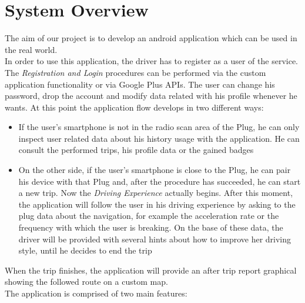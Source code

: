 \chapter{System Overview} \label{chap2}
The aim of our project is to develop an android application which can be used in the real world.\\
In order to use this application, the driver has to register as a user of the service. The \textit{Registration and Login} procedures can be performed via the custom application functionality or via Google Plus APIs.
The user can change his password, drop the account and modify data related with his profile whenever he wants.
At this point the application flow develops in two different ways:

\begin{itemize}
	\item If the user's smartphone is not in the radio scan area of the Plug, he can only inspect user related data about his history usage with the application. He can consult the performed trips, his profile data or the gained badges
	\item On the other side, if the user's smartphone is close to the Plug, he can pair his device with that Plug and, after the procedure has succeeded, he can start a new trip. Now the \textit{Driving Experience} actually begins. After this moment, the application will follow the user in his driving experience by asking to the plug data about the navigation, for example the acceleration rate or the frequency with which the user is breaking. On the base of these data, the driver will be provided with several hints about how to improve her driving style, until he decides to end the trip
\end{itemize}
When the trip finishes, the application will provide an after trip report graphical showing the followed route on a custom map.\\	
The application is comprised of two main features:

